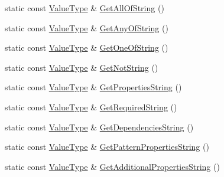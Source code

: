 \begin{DoxyCompactItemize}
\item 
static const \mbox{\hyperlink{classrapidjson_1_1internal_1_1_schema_a3979a9083c598195927c08c6e3ba91d1}{Value\+Type}} \& \mbox{\hyperlink{classrapidjson_1_1internal_1_1_schema_a36c068e3651c61f8a31cdb08de9ae543}{Get\+All\+Of\+String}} ()
\item 
static const \mbox{\hyperlink{classrapidjson_1_1internal_1_1_schema_a3979a9083c598195927c08c6e3ba91d1}{Value\+Type}} \& \mbox{\hyperlink{classrapidjson_1_1internal_1_1_schema_afe40efb889b03e5ca9ce17e963cd4967}{Get\+Any\+Of\+String}} ()
\item 
static const \mbox{\hyperlink{classrapidjson_1_1internal_1_1_schema_a3979a9083c598195927c08c6e3ba91d1}{Value\+Type}} \& \mbox{\hyperlink{classrapidjson_1_1internal_1_1_schema_a5666f2cc7d19bed4b0ba2a025ecb709f}{Get\+One\+Of\+String}} ()
\item 
static const \mbox{\hyperlink{classrapidjson_1_1internal_1_1_schema_a3979a9083c598195927c08c6e3ba91d1}{Value\+Type}} \& \mbox{\hyperlink{classrapidjson_1_1internal_1_1_schema_a9016e45a0104d1cdbf17044f8b955a0f}{Get\+Not\+String}} ()
\item 
static const \mbox{\hyperlink{classrapidjson_1_1internal_1_1_schema_a3979a9083c598195927c08c6e3ba91d1}{Value\+Type}} \& \mbox{\hyperlink{classrapidjson_1_1internal_1_1_schema_a1430ad3f2bb39e6b3a39130d8c9ad973}{Get\+Properties\+String}} ()
\item 
static const \mbox{\hyperlink{classrapidjson_1_1internal_1_1_schema_a3979a9083c598195927c08c6e3ba91d1}{Value\+Type}} \& \mbox{\hyperlink{classrapidjson_1_1internal_1_1_schema_a7ff55587c0d3733a699037fcd35f5f48}{Get\+Required\+String}} ()
\item 
static const \mbox{\hyperlink{classrapidjson_1_1internal_1_1_schema_a3979a9083c598195927c08c6e3ba91d1}{Value\+Type}} \& \mbox{\hyperlink{classrapidjson_1_1internal_1_1_schema_a93095a5d7afd8d15cc65d63f24e065e0}{Get\+Dependencies\+String}} ()
\item 
static const \mbox{\hyperlink{classrapidjson_1_1internal_1_1_schema_a3979a9083c598195927c08c6e3ba91d1}{Value\+Type}} \& \mbox{\hyperlink{classrapidjson_1_1internal_1_1_schema_acbe544950cf42426b079371f96ebf88f}{Get\+Pattern\+Properties\+String}} ()
\item 
static const \mbox{\hyperlink{classrapidjson_1_1internal_1_1_schema_a3979a9083c598195927c08c6e3ba91d1}{Value\+Type}} \& \mbox{\hyperlink{classrapidjson_1_1internal_1_1_schema_aa4a92842eec44378f08fcbc1b93d876d}{Get\+Additional\+Properties\+String}} ()
\item 

\end{DoxyCompactItemize}
